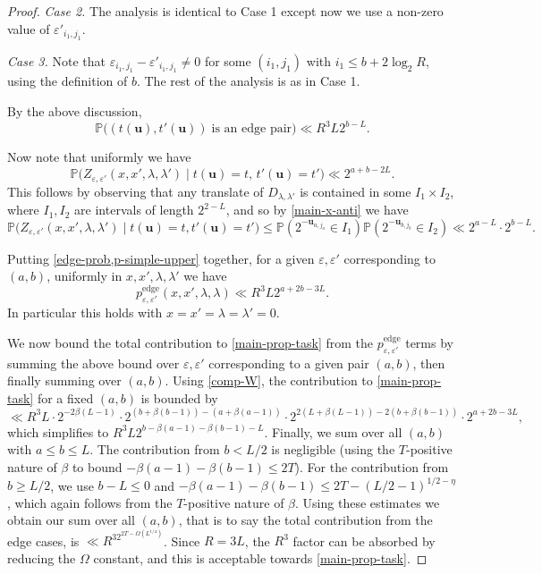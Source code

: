 \documentclass[11pt,reqno]{amsart}
\numberwithin{equation}{section}
\theoremstyle{definition}
\theoremstyle{remark}
\newcommand{\mb}{\mathbb}
\newcommand{\mbf}{\mathbf}
\newcommand\edge{\operatorname{edge}}
\newcommand{\eps}{\varepsilon}
\renewcommand{\le}{\leqslant}
\renewcommand{\ge}{\geqslant}
\begin{document}
\begin{proof}
\emph{Case 2.} The analysis is identical to Case 1 except now we use a non-zero value of $\eps'_{i_1,j_1}$.

\emph{Case 3.} Note that $\eps_{i_1,j_1} - \eps'_{i_1,j_1} \ne 0$ for some $(i_1, j_1)$ with $i_1 \le b + 2\log_2 R$, using the definition of $b$. The rest of the analysis is as in Case 1. 

By the above discussion, 
\begin{equation}\label{edge-prob} \mb{P} \big( (t(\mbf{u}), t'(\mbf{u})) \; \mbox{is an edge pair}\big) \ll R^3 L 2^{b - L}.\end{equation}

Now note that uniformly we have
\[ \mb{P}\big(  Z_{\eps,\eps'}(x,x',\lambda,\lambda') \mid t(\mbf{u}) = t, \, t'(\mbf{u}) = t'\big) \ll 2^{a + b  - 2L}.\] This follows by observing that any translate of $D_{\lambda,\lambda'}$ is contained in some $I_1 \times I_2$, where $I_1, I_2$ are intervals of length $2^{2 - L}$, and so by \cref{main-x-anti} we have 
\begin{equation}\label{p-simple-upper}  \mb{P}\big( Z_{\eps,\eps'}(x,x',\lambda,\lambda') \mid t(\mbf{u}) = t, t'(\mbf{u}) = t'\big) \le \mb{P}(2^{-\mbf{u}_{a, j_a}} \in I_1) \mb{P}(2^{-\mbf{u}_{b, j_b}} \in I_2) \ll 2^{a - L} \cdot 2^{b - L}.\end{equation}

Putting \cref{edge-prob,p-simple-upper} together, for a given $\eps, \eps'$ corresponding to $(a,b)$, uniformly in $x, x',\lambda,\lambda'$ we have
\[ p_{\eps,\eps'}^{\edge}(x, x', \lambda,\lambda) \ll R^3L 2^{a + 2b - 3L}.\] In particular this holds with $x = x' = \lambda = \lambda'=  0$.

We now bound the total contribution to \cref{main-prop-task} from the $p_{\eps,\eps'}^{\edge}$ terms by summing the above bound over $\eps, \eps'$ corresponding to a given pair $(a,b)$, then finally summing over $(a,b)$. Using \cref{comp-W}, the contribution to \cref{main-prop-task} for a fixed $(a,b)$ is bounded by 
\[ \ll R^3L \cdot 2^{-2\beta(L-1)} \cdot  2^{(b + \beta(b-1)) - (a + \beta(a - 1))} \cdot 2^{2(L + \beta(L-1)) - 2(b + \beta(b-1))}\cdot 2^{a + 2b - 3L},\] which simplifies to $R^3 L 2^{b - \beta(a - 1) - \beta(b - 1) - L}$. 
Finally, we sum over all $(a,b)$ with $a \le b \le L$. The contribution from $b < L/2$ is negligible (using the $T$-positive nature of $\beta$ to bound $-\beta(a - 1) - \beta(b - 1) \le 2T$). For the contribution from $b \ge L/2$, we use $b - L \le 0$ and $-\beta(a - 1) - \beta(b - 1) \le 2T - (L/2 - 1)^{1/2 - \eta}$, which again follows from the $T$-positive nature of $\beta$. Using these estimates we obtain our sum over all $(a,b)$, that is to say the total contribution from the edge cases, is $\ll R^32^{2T - \Omega(L^{1/4})}$. Since $R = 3L$, the $R^3$ factor can be absorbed by reducing the $\Omega$ constant, and this is acceptable towards \cref{main-prop-task}.\vspace*{8pt}


\end{proof}
\end{document}
